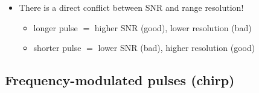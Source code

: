 \documentclass[11pt, oneside]{article}
\newcommand{\PN}{P_\mathrm{N}}
\begin{document}
\begin{itemize}
\begin{itemize}
		\item Signal to noise ratio is then simply received power $P_r$ divided by $\PN$
		\begin{equation}
			\label{e:SNR}
			\mathrm{SNR} = \frac{P_r}{\PN}
		\end{equation}
		\item To increase SNR, want to maximize energy in each pulse $\rightarrow$ can be done by increasing peak power or by using a longer pulse
		\item Peak power usually limited by power supply (esp.\ on satellites) $\Rightarrow$ increasing SNR depends on lengthening pulse duration
	\end{itemize}
	\item[--] There is a direct conflict between SNR and range resolution!
	\begin{itemize}
		\item longer pulse $=$ higher SNR (good), lower resolution (bad)
		\item shorter pulse $=$ lower SNR (bad), higher resolution (good)
	\end{itemize}
\end{itemize}

\subsection{Frequency-modulated pulses (chirp)}
\label{s:chirp}
\end{document}
